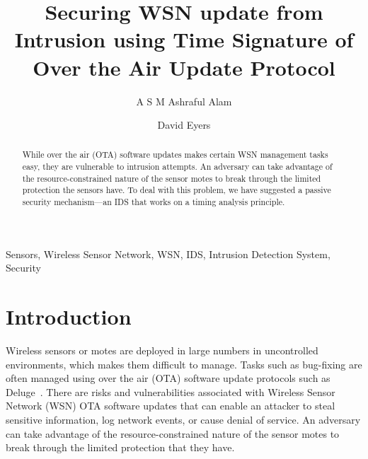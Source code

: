 \documentclass{CRPITStyle}
\renewcommand{\cite}{\citep}
\begin{document}
\title{Securing WSN update from Intrusion using Time Signature of Over the Air Update Protocol}
\author{A S M Ashraful Alam  \and  David Eyers 	  }

\maketitle

\newcommand\conferencenameandplace{Twenty-Ninth Australasian Computer Science Conference (ACSC2006), Hobart, Australia}
\newcommand\volumenumber{48}
\newcommand\conferenceyear{2006}
\newcommand\editorname{Vladimir Estivill-Castro and Gillian Dobbie}
\toappearstandard 

\begin{abstract}
While over the air (OTA) software updates makes certain WSN management tasks easy, they are vulnerable to intrusion attempts.
An adversary can take advantage of the resource-constrained nature of the sensor motes to break through the limited protection the sensors have.
To deal with this problem, we have suggested a passive security mechanism---an IDS that works on a timing analysis principle.  
\end{abstract}
\vspace{.1in}

 Sensors, Wireless Sensor Network, WSN, IDS, Intrusion Detection System, Security

\section{Introduction}
\label{sec:intro}

Wireless sensors or motes are deployed in large numbers in uncontrolled environments, which makes them difficult to manage.
Tasks such as bug-fixing are often managed using over the air (OTA) software update protocols such as Deluge~\cite{1031506}.
There are risks and vulnerabilities associated with Wireless Sensor Network (WSN) OTA software updates that can enable an attacker to steal sensitive information, log network events, or cause denial of service.
An adversary can take advantage of the resource-constrained nature of the sensor motes to break through the limited protection that they have.
\end{document}
